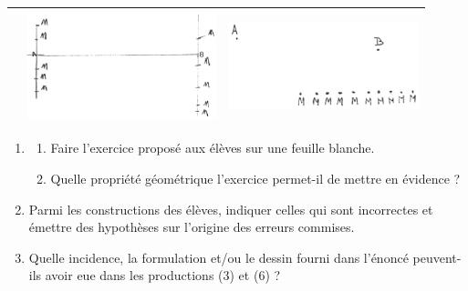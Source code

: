 \begin{exercice}
\begin{tabular}{|p{5.5cm}|p{5.5cm}|p{5.5cm}|}
   &
   \includegraphics[width=5.5cm]{Geometrie_did/Images/Geo5_analyse_cercle_T5}
   &
   \includegraphics[width=5.5cm]{Geometrie_did/Images/Geo5_analyse_cercle_T6} \\
   \hline
\end{tabular}

\begin{enumerate}
   \item
   \begin{enumerate}
      \item Faire l'exercice proposé aux élèves sur une feuille blanche.
      \item Quelle propriété géométrique l'exercice permet-il de mettre en évidence ?
   \end{enumerate}
   \item Parmi les constructions des élèves, indiquer celles qui sont incorrectes et émettre des hypothèses sur l'origine des erreurs commises.
   \item Quelle incidence, la formulation et/ou le dessin fourni dans l'énoncé peuvent-ils avoir eue dans les productions (3) et (6) ?
\end{enumerate}
\end{exercice}

